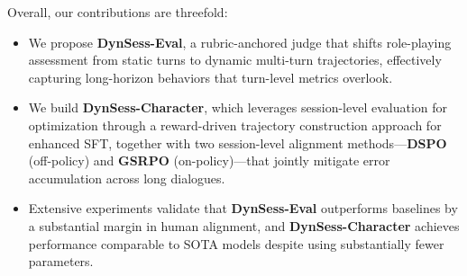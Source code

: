 Overall, our contributions are threefold:
\begin{itemize}
\item We propose \textbf{DynSess-Eval}, a rubric-anchored judge that shifts role-playing assessment from static turns to dynamic multi-turn trajectories, effectively capturing long-horizon behaviors that turn-level metrics overlook. 


\item We build \textbf{DynSess-Character}, which leverages session-level evaluation for optimization through a reward-driven trajectory construction approach for enhanced SFT, together with two session-level alignment methods—\textbf{DSPO} (off-policy) and \textbf{GSRPO} (on-policy)—that jointly mitigate error accumulation across long dialogues.

\item Extensive experiments validate that \textbf{DynSess-Eval} outperforms baselines by a substantial margin in human alignment, and \textbf{DynSess-Character} achieves performance comparable to SOTA models despite using substantially fewer parameters.

\end{itemize}






